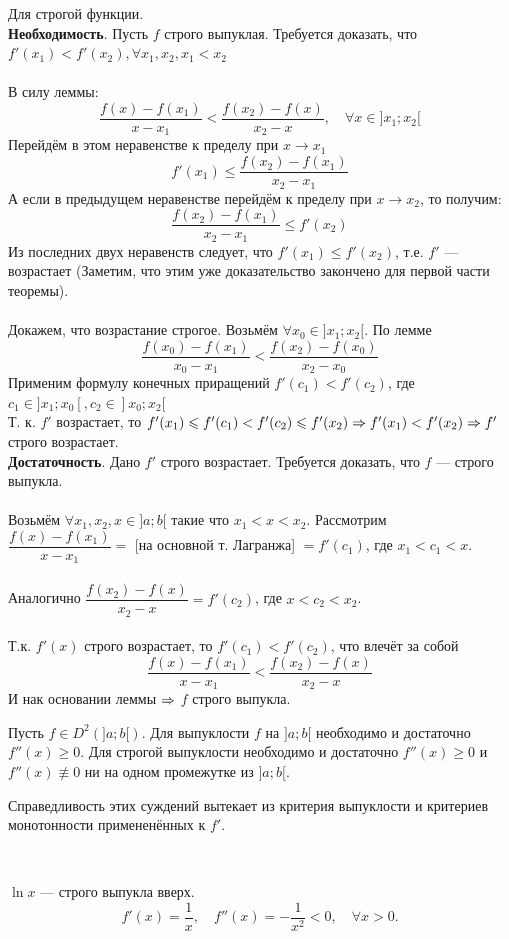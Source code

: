 \begin{Proof}Для строгой функции.\\
	\textbf{Необходимость}. Пусть $f$ строго выпуклая. Требуется доказать, что $f'(x_{1}) < f'(x_{2}), \forall x_{1}, x_{2}, x_{1} < x_{2}$ \\\\
	В силу леммы: 
	$$\frac{f(x) - f(x_{1})}{x - x_{1}} < \frac{f(x_{2}) - f(x)}{x_{2} - x},\quad \forall x \in ]x_{1};x_{2}[$$
	Перейдём в этом неравенстве к пределу при $x \xrightarrow{} x_{1}$
	$$f'(x_{1}) \leq \frac{f(x_{2}) - f(x_{1})}{x_{2} - x_{1}}$$
	А если в предыдущем неравенстве перейдём к пределу при $x \xrightarrow{} x_{2}$, то получим:
	$$\frac{f(x_{2}) - f(x_{1})}{x_{2} - x_{1}} \leq f'(x_{2})$$
	Из последних двух неравенств следует, что $f'(x_{1}) \leq f'(x_{2})$, т.е. $f'$ --- возрастает (Заметим, что этим уже доказательство закончено для первой части теоремы).\\\\
	Докажем, что возрастание строгое.
	Возьмём $\forall x_{0} \in ]x_{1}; x_{2}[$. По лемме
	$$\frac{f(x_{0}) - f(x_{1})}{x_{0} - x_{1}} < \frac{f(x_{2}) - f(x_{0})}{x_{2} - x_{0}}$$
	Применим формулу конечных приращений $f'(c_{1}) < f'(c_{2})$, где $c_{1} \in ]x_{1};x_{0}[, c_{2} \in ]x_{0};x_{2}[$ \\
	Т. к. $f'$ возрастает, то 
	$f'(x_{1}) \leqslant f'(c_{1}) < f'(c_{2}) \leqslant f'(x_{2}) \Rightarrow f'(x_{1}) < f'(x_{2}) \Rightarrow f'$ строго возрастает. \\
	\textbf{Достаточность}. Дано $f'$ строго возрастает. Требуется доказать, что $f$ --- строго выпукла. \\\\
	Возьмём $\forall x_{1}, x_{2}, x \in ]a;b[$ такие что $x_{1} < x < x_{2}$.
	Рассмотрим $\dfrac{f(x) - f(x_{1})}{x - x_{1}} = $ [на основной т. Лагранжа] $= f'(c_{1})$, где $x_{1} < c_{1} < x$.\\\\
	Аналогично $\dfrac{f(x_{2}) - f(x)}{x_{2} - x} = f'(c_{2})$, где $x < c_{2} < x_{2}$.\\\\
	Т.к. $f'(x)$ строго возрастает, то $f'(c_{1}) < f'(c_{2})$, что влечёт за собой 
	$$\frac{f(x) - f(x_{1})}{x - x_{1}} < \frac{f(x_{2}) - f(x)}{x_{2} - x}$$
	И нак основании леммы $\Rightarrow$ $f$ строго выпукла.
\end{Proof}
\begin{cor}
	Пусть $f \in D^2(]a;b[)$. Для выпуклости $f$ на  $]a;b[$ необходимо и достаточно $f''(x) \geq 0$. Для строгой выпуклости необходимо и достаточно $f''(x) \geq 0$ и $f''(x) \not\equiv 0$ ни на одном промежутке из $]a;b[$.
\end{cor}
\begin{Proof}
	Справедливость этих суждений вытекает из критерия выпуклости и критериев монотонности примененённых к $f'$.
\end{Proof}\\
\begin{example}
	$\ln x$ --- строго выпукла вверх.
	$$f'(x) = \frac{1}{x},\quad f''(x) = - \frac{1}{x^2} < 0,\quad \forall x > 0.$$
\end{example}
